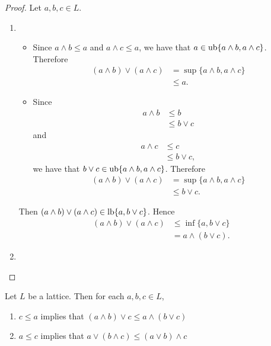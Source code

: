 \documentclass{book}
\begin{document}
	\begin{proof} Let $a,b,c \in L$.
		\begin{enumerate}
			\item 
			\begin{itemize}
				\item Since $a \wedge b \leq a$ and $a \wedge c \leq a$, we have that $a \in \operatorname{ub} \{a \wedge b, a \wedge c \}$. Therefore 
				\begin{align*}
					(a \wedge b) \vee (a \wedge c) 
					& = \sup \{a \wedge b, a \wedge c \} \\
					& \leq a.
				\end{align*}
				\item Since  
				\begin{align*}
					a \wedge b 
					& \leq b \\
					& \leq b \vee c
				\end{align*}
				and 
				\begin{align*}
					a \wedge c 
					& \leq c \\
					& \leq b \vee c,
				\end{align*}
				we have that $b \vee c \in \operatorname{ub} \{a \wedge b, a \wedge c\}$. Therefore 
				\begin{align*}
					(a \wedge b) \vee (a \wedge c) 
					& = \sup \{a \wedge b, a \wedge c \} \\
					& \leq b \vee c. 
				\end{align*}
			\end{itemize}
			Then $(a \wedge b) \vee (a \wedge c) \in \operatorname{lb}\{a, b \vee c\}$. Hence 
			\begin{align*}
				(a \wedge b) \vee (a \wedge c) 
				& \leq \inf \{a, b \vee c\} \\
				& = a \wedge (b \vee c).
			\end{align*}
			\item {}
		\end{enumerate}
	\end{proof}
	
	\begin{ex}
		Let $L$ be a lattice. Then for each $a,b,c \in L$,
		\begin{enumerate}
			\item $c \leq a$ implies that $(a \wedge b) \vee c \leq a \wedge (b \vee c)$
			\item $a \leq c$ implies that $a \vee (b \wedge c) \leq (a \vee b) \wedge c$
		\end{enumerate}
	\end{ex}
	
\end{document}
